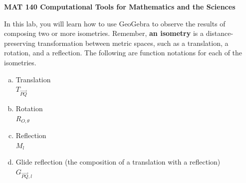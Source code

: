 \documentclass[11pt]{article}
\begin{document}
\begin{center}
{\bf MAT 140 \quad Computational Tools for Mathematics and the Sciences}

\end{center}

\medskip
{}

\smallskip


\smallskip


\smallskip



\vspace{0.2 in}



\smallskip

\noindent In this lab, you will learn how to use GeoGebra to observe the results of composing two or more isometries. Remember, {\bf an isometry} is a distance-preserving transformation between metric spaces, such as a translation, a rotation, and a reflection. The following are function notations for each of the isometries. 
	\begin{enumerate}[(a)]
	\item Translation \\ $T_{\vec{PQ}}$ 	
	\item Rotation \\ $R_{O, \theta}$
	\item Reflection \\ $M_l$ 
	\item Glide reflection (the composition of a translation with a reflection) \\ $G_{\vec{PQ}, l}$\\
	\end{enumerate}


\vspace{0.2 in}

\end{document}
